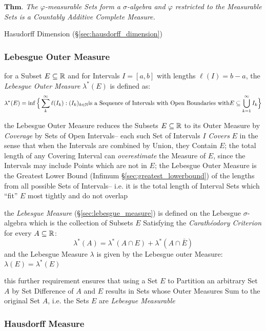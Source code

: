 $\textbf{Thm.}$ \emph{
  The $\varphi$-measurable Sets form a $\sigma$-algebra and $\varphi$ restricted
  to the Measurable Sets is a Countably Additive Complete Measure.
}

Hasudorff Dimension (\S\ref{sec:hausdorff_dimension})



\subsubsection{Lebesgue Outer Measure}\label{sec:lebesgue_outer_measure}

for a Subset $E \subseteq \mathbb{R}$ and for Intervals $I = [a,b]$ with lengths
$\ell(I) = b-a$, the \emph{Lebesgue Outer Measure} $\lambda^*(E)$ is defined as:
\[
  \lambda^*(E) = \inf \Big\{ \sum_k^\infty \ell(I_k) : (I_k)_{k \in \mathbb{N}}
    \text{is a Sequence of Intervals with Open Boundaries with}
    E \subseteq \bigcup_{k=1}^\infty I_k \Big\}
\]

the Lebesgue Outer Measure reduces the Subsets $E \subseteq \mathbb{R}$ to its Outer
Measure by \emph{Coverage} by Sets of Open Intervals-- each such Set of
Intervals $I$ \emph{Covers} $E$ in the sense that when the Intervals are
combined by Union, they Contain $E$; the total length of any Covering Interval
can \emph{overestimate} the Measure of $E$, since the Intervals may include
Points which are not in $E$; the Lebesgue Outer Measure is the Greatest Lower
Bound (Infimum \S\ref{sec:greatest_lowerbound}) of the lengths from all possible
Sets of Intervals-- i.e. it is the total length of Interval Sets which ``fit''
$E$ most tightly and do not overlap

the \emph{Lebesgue Measure} (\S\ref{sec:lebesgue_measure}) is defined on the
Lebesgue $\sigma$-algebra which is the collection of Subsets $E$ Satisfying the
\emph{Carath\'eodory Criterion} for every $A \subseteq \mathbb{R}$:
\[
  \lambda^*(A) = \lambda^*(A \cap E) + \lambda^*(A \cap \bar{E})
\]
and the Lebesgue Measure $\lambda$ is given by the Lebesgue outer Measure:
$\lambda(E) = \lambda^*(E)$

this further requirement ensures that using a Set $E$ to Partition an arbitrary
Set $A$ by Set Difference of $A$ and $E$ results in Sets whose Outer Measures
Sum to the original Set $A$, i.e. the Sets $E$ are \emph{Lebesgue Measurable}



\subsubsection{Hausdorff Measure}\label{sec:hausdorff_measure}

